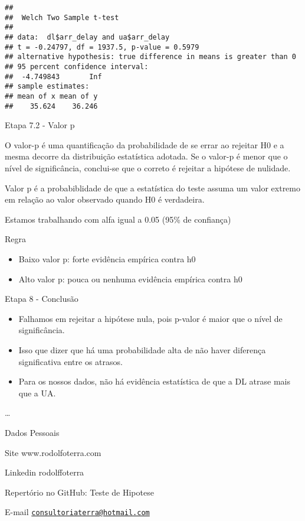 \documentclass[]{article}
\providecommand{\tightlist}{%
  \setlength{\itemsep}{0pt}\setlength{\parskip}{0pt}}
\begin{document}
\begin{verbatim}
## 
##  Welch Two Sample t-test
## 
## data:  dl$arr_delay and ua$arr_delay
## t = -0.24797, df = 1937.5, p-value = 0.5979
## alternative hypothesis: true difference in means is greater than 0
## 95 percent confidence interval:
##  -4.749843       Inf
## sample estimates:
## mean of x mean of y 
##    35.624    36.246
\end{verbatim}

Etapa 7.2 - Valor p

O valor-p é uma quantificação da probabilidade de se errar ao rejeitar
H0 e a mesma decorre da distribuição estatística adotada. Se o valor-p é
menor que o nível de significância, conclui-se que o correto é rejeitar
a hipótese de nulidade.

Valor p é a probabiblidade de que a estatística do teste assuma um valor
extremo em relação ao valor observado quando H0 é verdadeira.

Estamos trabalhando com alfa igual a 0.05 (95\% de confiança)

Regra

\begin{itemize}
\tightlist
\item
  Baixo valor p: forte evidência empírica contra h0
\item
  Alto valor p: pouca ou nenhuma evidência empírica contra h0

   
\end{itemize}

Etapa 8 - Conclusão

\begin{itemize}
\tightlist
\item
  Falhamos em rejeitar a hipótese nula, pois p-valor é maior que o nível
  de significância.
\item
  Isso que dizer que há uma probabilidade alta de não haver diferença
  significativa entre os atrasos.
\item
  Para os nossos dados, não há evidência estatística de que a DL atrase
  mais que a UA.
\end{itemize}

\ldots{}

Dados Pessoais

Site www.rodolfoterra.com

Linkedin rodolffoterra

Repertório no GitHub: Teste de Hipotese

E-mail
\href{mailto:consultoriaterra@hotmail.com}{\nolinkurl{consultoriaterra@hotmail.com}}
\end{document}
